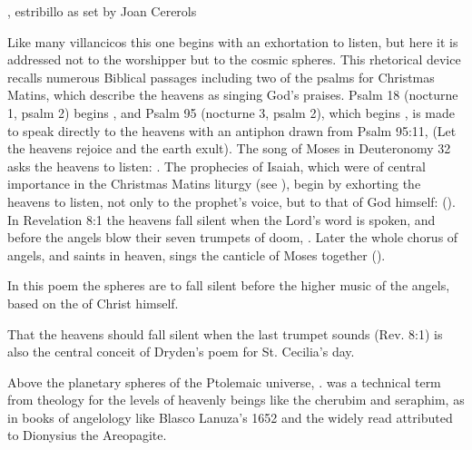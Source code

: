 {, estribillo as set by Joan Cererols}

Like many villancicos this one begins with an exhortation to listen, but here it
is addressed not to the worshipper but to the cosmic spheres. 
This rhetorical device recalls numerous Biblical passages including two of the
psalms for Christmas Matins, which describe the heavens as singing God's
praises.
Psalm 18 (nocturne 1, psalm 2) begins , and Psalm 95 (nocturne 3, psalm 2), which begins , is made to speak directly to the heavens
with an antiphon drawn from Psalm 95:11,  (Let the heavens rejoice and the earth exult).%
    \Autocite[169--179]{Catholic:Breviarium1631}
The song of Moses in Deuteronomy 32 asks the heavens to listen: . 
The prophecies of Isaiah, which were of central importance in the Christmas
Matins liturgy (see ), begin by exhorting the heavens to
listen, not only to the prophet's voice, but to that of God himself:
 ().
In Revelation 8:1 the heavens fall silent when the Lord's word is spoken, and
before the angels blow their seven trumpets of doom, .
Later the whole chorus of angels,  and saints in
heaven, sings the canticle of Moses together ().

In this poem the spheres are to fall silent before the higher music of the
angels, based on the  of Christ himself.%
\begin{Footnote}
    That the heavens should fall silent when the last trumpet sounds (Rev. 8:1)
    is also the central conceit of Dryden's poem for St. Cecilia's day. 
\end{Footnote}
Above the planetary spheres of the Ptolemaic universe, . 
 was a technical term from theology for the levels of
heavenly beings like the cherubim and seraphim, as in books of angelology like
Blasco Lanuza's 1652  and
the widely read  attributed to Dionysius the
Areopagite.%
    \Autocite[See also][, 393]{Kircher:Musurgia}

